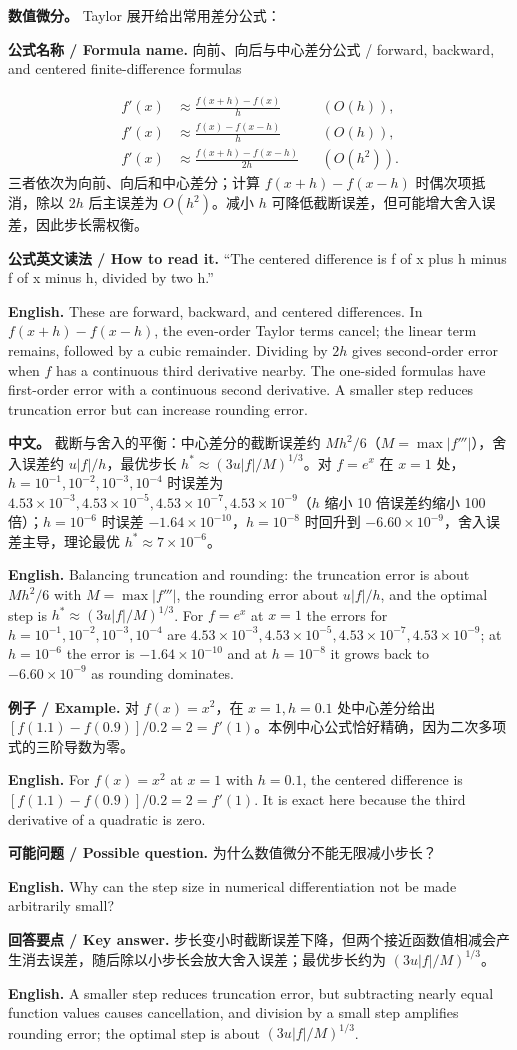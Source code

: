 \documentclass[UTF8,11pt,a4paper]{ctexart}
\newcommand{\EN}[1]{\par\noindent\textbf{English.} #1\par}
\newcommand{\READ}[1]{\par\noindent\textbf{公式英文读法 / How to read it.} #1\par}
\newcommand{\FORMULA}[2]{\par\noindent\textbf{公式名称 / Formula name.} #1 / #2\par}
\newcommand{\EX}[2]{\par\noindent\textbf{例子 / Example.} #1\par\EN{#2}}
\newcommand{\ASK}[4]{\par\noindent\textbf{可能问题 / Possible question.} #1\par\EN{#2}\noindent\textbf{回答要点 / Key answer.} #3\par\EN{#4}\medskip}
\newcommand{\APS}[2]{\par\noindent\textbf{中文。} #1\par\noindent\textbf{English.} #2\par\smallskip}
\begin{document}
\noindent\textbf{数值微分。} Taylor 展开给出常用差分公式：
\FORMULA{向前、向后与中心差分公式}{forward, backward, and centered finite-difference formulas}
\[
\begin{aligned}
f'(x)&\approx\frac{f(x+h)-f(x)}h &&(O(h)),\\
f'(x)&\approx\frac{f(x)-f(x-h)}h &&(O(h)),\\
f'(x)&\approx\frac{f(x+h)-f(x-h)}{2h} &&(O(h^2)).
\end{aligned}
\]
三者依次为向前、向后和中心差分；计算 $f(x+h)-f(x-h)$ 时偶次项抵消，除以 $2h$ 后主误差为 $O(h^2)$。减小 $h$ 可降低截断误差，但可能增大舍入误差，因此步长需权衡。
\READ{“The centered difference is f of x plus h minus f of x minus h, divided by two h.”}
\EN{These are forward, backward, and centered differences. In $f(x+h)-f(x-h)$, the even-order Taylor terms cancel; the linear term remains, followed by a cubic remainder. Dividing by $2h$ gives second-order error when $f$ has a continuous third derivative nearby. The one-sided formulas have first-order error with a continuous second derivative. A smaller step reduces truncation error but can increase rounding error.}
\APS{截断与舍入的平衡：中心差分的截断误差约 $Mh^2/6$（$M=\max|f'''|$），舍入误差约 $u|f|/h$，最优步长 $h^*\approx(3u|f|/M)^{1/3}$。对 $f=e^x$ 在 $x=1$ 处，$h=10^{-1},10^{-2},10^{-3},10^{-4}$ 时误差为 $4.53\times10^{-3},4.53\times10^{-5},4.53\times10^{-7},4.53\times10^{-9}$（$h$ 缩小 10 倍误差约缩小 100 倍）；$h=10^{-6}$ 时误差 $-1.64\times10^{-10}$，$h=10^{-8}$ 时回升到 $-6.60\times10^{-9}$，舍入误差主导，理论最优 $h^*\approx7\times10^{-6}$。}{Balancing truncation and rounding: the truncation error is about $Mh^2/6$ with $M=\max|f'''|$, the rounding error about $u|f|/h$, and the optimal step is $h^*\approx(3u|f|/M)^{1/3}$. For $f=e^x$ at $x=1$ the errors for $h=10^{-1},10^{-2},10^{-3},10^{-4}$ are $4.53\times10^{-3},4.53\times10^{-5},4.53\times10^{-7},4.53\times10^{-9}$; at $h=10^{-6}$ the error is $-1.64\times10^{-10}$ and at $h=10^{-8}$ it grows back to $-6.60\times10^{-9}$ as rounding dominates.}

\EX{对 $f(x)=x^2$，在 $x=1,h=0.1$ 处中心差分给出 $[f(1.1)-f(0.9)]/0.2=2=f'(1)$。本例中心公式恰好精确，因为二次多项式的三阶导数为零。}{For $f(x)=x^2$ at $x=1$ with $h=0.1$, the centered difference is $[f(1.1)-f(0.9)]/0.2=2=f'(1)$. It is exact here because the third derivative of a quadratic is zero.}

\ASK{为什么数值微分不能无限减小步长？}{Why can the step size in numerical differentiation not be made arbitrarily small?}{步长变小时截断误差下降，但两个接近函数值相减会产生消去误差，随后除以小步长会放大舍入误差；最优步长约为 $(3u|f|/M)^{1/3}$。}{A smaller step reduces truncation error, but subtracting nearly equal function values causes cancellation, and division by a small step amplifies rounding error; the optimal step is about $(3u|f|/M)^{1/3}$.}
\end{document}
